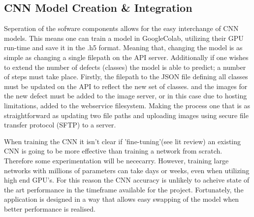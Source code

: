     \subsection{CNN Model Creation \& Integration}
      Seperation of the sofware components allows for the easy interchange of CNN models. This means one can train a model in GoogleColab, utilizing their GPU run-time and save it in the .h5 format. Meaning that, changing the model is as simple as changing a single filepath on the API server. Additionally if one wishes to extend the number of defects (classes) the model is able to predict; a number of steps must take place. Firstly, the filepath to the JSON file defining all classes must be updated on the API to reflect the new set of classes. and the images for the new defect must be added to the image server, or in this case due to hosting limitations, added to the webservice filesystem. Making the process one that is as straightforward as updating two file paths and uploading images using secure file transfer protocol (SFTP) to a server.
      \par
      When training the CNN it isn't clear if 'fine-tuning'(see lit review) an existing CNN is going to be more effective than training a network from scratch. Therefore some experimentation will be nececarry. However, training large networks with millions of parameters can take days or weeks, even when utilizing high end GPU's. For this reason the CNN accuracy is unlikely to acheive state of the art performance in the timeframe available for the project. Fortunately, the application is designed in a way that allows easy swapping of the model when better performance is realised.
      \par
